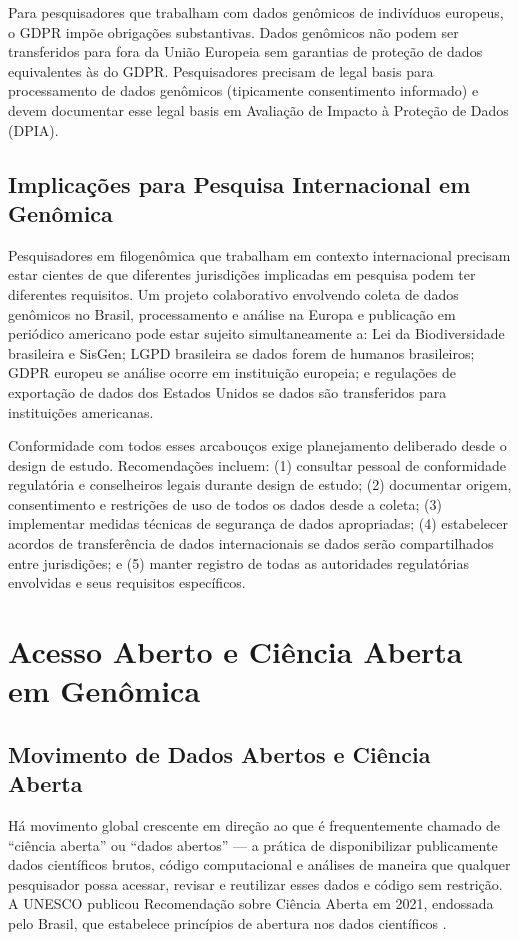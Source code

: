 Para pesquisadores que trabalham com dados genômicos de indivíduos europeus, o GDPR impõe obrigações substantivas. Dados genômicos não podem ser transferidos para fora da União Europeia sem garantias de proteção de dados equivalentes às do GDPR. Pesquisadores precisam de legal basis para processamento de dados genômicos (tipicamente consentimento informado) e devem documentar esse legal basis em Avaliação de Impacto à Proteção de Dados (DPIA).

\subsection{Implicações para Pesquisa Internacional em Genômica}

Pesquisadores em filogenômica que trabalham em contexto internacional precisam estar cientes de que diferentes jurisdições implicadas em pesquisa podem ter diferentes requisitos. Um projeto colaborativo envolvendo coleta de dados genômicos no Brasil, processamento e análise na Europa e publicação em periódico americano pode estar sujeito simultaneamente a: Lei da Biodiversidade brasileira e SisGen; LGPD brasileira se dados forem de humanos brasileiros; GDPR europeu se análise ocorre em instituição europeia; e regulações de exportação de dados dos Estados Unidos se dados são transferidos para instituições americanas.

Conformidade com todos esses arcabouços exige planejamento deliberado desde o design de estudo. Recomendações incluem: (1) consultar pessoal de conformidade regulatória e conselheiros legais durante design de estudo; (2) documentar origem, consentimento e restrições de uso de todos os dados desde a coleta; (3) implementar medidas técnicas de segurança de dados apropriadas; (4) estabelecer acordos de transferência de dados internacionais se dados serão compartilhados entre jurisdições; e (5) manter registro de todas as autoridades regulatórias envolvidas e seus requisitos específicos.

\section{Acesso Aberto e Ciência Aberta em Genômica}

\subsection{Movimento de Dados Abertos e Ciência Aberta}

Há movimento global crescente em direção ao que é frequentemente chamado de ``ciência aberta'' ou ``dados abertos'' --- a prática de disponibilizar publicamente dados científicos brutos, código computacional e análises de maneira que qualquer pesquisador possa acessar, revisar e reutilizar esses dados e código sem restrição. A UNESCO publicou Recomendação sobre Ciência Aberta em 2021, endossada pelo Brasil, que estabelece princípios de abertura nos dados científicos \parencite{unesco2021}.

